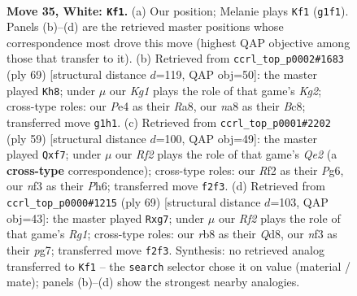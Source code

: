 \documentclass[11pt]{article}
\begin{document}
\clearpage

\begin{figure}[p]\centering
\begin{subfigure}{0.46\textwidth}\centering
\resizebox{\linewidth}{!}{%
\newchessgame
\chessboard[
  setfen={nr4k1/Q4pb1/R6B/4p3/4P3/1r3nq1/1P3RN1/1N4K1 w - - 0 35},
  showmover=false,
  pgfstyle=straightmove, color=movearrow, markmove={g1-f1}
]}
\caption{}
\end{subfigure}\hfill
\begin{subfigure}{0.46\textwidth}\centering
\resizebox{\linewidth}{!}{%
\newchessgame
\chessboard[
  setfen={r1b5/3Nb1k1/p1Q5/8/Pp2P3/4q3/1P2Br2/R3K1R1 b - - 7 35},
  showmover=false,
  pgfstyle=straightmove, color=movearrow, markmove={g7-h8}
]}
\caption{}
\end{subfigure}
\\[4pt]
\begin{subfigure}{0.46\textwidth}\centering
\resizebox{\linewidth}{!}{%
\newchessgame
\chessboard[
  setfen={br2r3/4qQnk/p5pp/8/4P3/pB2RN1P/5PP1/2R3K1 b - - 1 30},
  showmover=false,
  pgfstyle=straightmove, color=movearrow, markmove={e7-f7}
]}
\caption{}
\end{subfigure}\hfill
\begin{subfigure}{0.46\textwidth}\centering
\resizebox{\linewidth}{!}{%
\newchessgame
\chessboard[
  setfen={3q2rk/6P1/4p1Q1/p3Pp2/3P4/2n2B2/1r2Nb2/R3RK2 b - - 0 35},
  showmover=false,
  pgfstyle=straightmove, color=movearrow, markmove={g8-g7}
]}
\caption{}
\end{subfigure}
\caption{\textbf{Move 35, White: \texttt{Kf1}.} (a) Our position; Melanie plays \texttt{Kf1} (\texttt{g1f1}). Panels (b)--(d) are the retrieved master positions whose correspondence most drove this move (highest QAP objective among those that transfer to it). (b) Retrieved from \texttt{ccrl\_top\_p0002\#1683} (ply 69) [structural distance $d$=119, QAP obj=50]: the master played \texttt{Kh8}; under $\mu$ our \emph{Kg1} plays the role of that game's \emph{Kg2}; cross-type roles: our \emph{P}e4 as their \emph{R}a8, our \emph{n}a8 as their \emph{B}c8; transferred move \texttt{g1h1}. (c) Retrieved from \texttt{ccrl\_top\_p0001\#2202} (ply 59) [structural distance $d$=100, QAP obj=49]: the master played \texttt{Qxf7}; under $\mu$ our \emph{Rf2} plays the role of that game's \emph{Qe2} (a \textbf{cross-type} correspondence); cross-type roles: our \emph{R}f2 as their \emph{P}g6, our \emph{n}f3 as their \emph{P}h6; transferred move \texttt{f2f3}. (d) Retrieved from \texttt{ccrl\_top\_p0000\#1215} (ply 69) [structural distance $d$=103, QAP obj=43]: the master played \texttt{Rxg7}; under $\mu$ our \emph{Rf2} plays the role of that game's \emph{Rg1}; cross-type roles: our \emph{r}b8 as their \emph{Q}d8, our \emph{n}f3 as their \emph{p}g7; transferred move \texttt{f2f3}. Synthesis: no retrieved analog transferred to \texttt{Kf1} -- the \texttt{search} selector chose it on value (material / mate); panels (b)--(d) show the strongest nearby analogies.}
\label{fig:thought-m68}
\end{figure}
\end{document}
